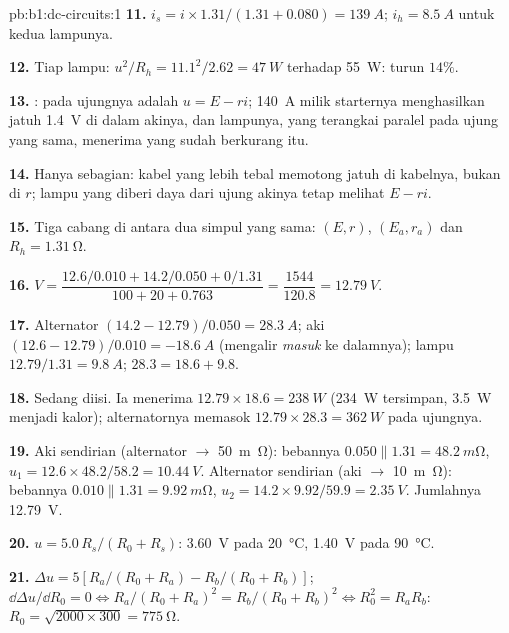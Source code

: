 \begin{solution}{pb:b1:dc-circuits:1}
\textbf{11.} $i_s = i \times 1.31/(1.31 + 0.080) = \qty{139}{A}$; $i_h =
\qty{8.5}{A}$ untuk kedua lampunya.

\textbf{12.} Tiap lampu: $u^2/R_h = 11.1^2/2.62 = \qty{47}{W}$ terhadap
\qty{55}{W}: turun $14\%$.

\textbf{13.} :  pada ujungnya adalah $u = E - ri$;
\qty{140}{A} milik starternya menghasilkan jatuh  \qty{1.4}{V}
di dalam akinya, dan lampunya, yang terangkai paralel pada ujung yang
sama, menerima  yang sudah berkurang itu.

\textbf{14.} Hanya sebagian: kabel yang lebih tebal memotong jatuh
 di kabelnya, bukan di $r$; lampu yang diberi daya dari ujung
akinya tetap melihat $E - ri$.

\textbf{15.} Tiga cabang di antara dua simpul yang sama: $(E, r)$,
$(E_a, r_a)$ dan $R_h = \qty{1.31}{\ohm}$.

\textbf{16.} $V = \dfrac{12.6/0.010 + 14.2/0.050 + 0/1.31}{100 + 20 + 0.763}
= \dfrac{1544}{120.8} = \qty{12.79}{V}$.

\textbf{17.} Alternator $(14.2 - 12.79)/0.050 = \qty{28.3}{A}$; aki
$(12.6 - 12.79)/0.010 = \qty{-18.6}{A}$ (mengalir \emph{masuk} ke
dalamnya); lampu $12.79/1.31 = \qty{9.8}{A}$; $28.3 = 18.6 + 9.8$.

\textbf{18.} Sedang diisi. Ia menerima $12.79 \times 18.6 = \qty{238}{W}$
(\qty{234}{W} tersimpan, \qty{3.5}{W} menjadi kalor); alternatornya
memasok $12.79 \times 28.3 = \qty{362}{W}$ pada ujungnya.

\textbf{19.} Aki sendirian (alternator $\to$ \qty{50}{m\ohm}): bebannya
$0.050 \parallel 1.31 = \qty{48.2}{m\ohm}$, $u_1 = 12.6 \times 48.2/58.2 =
\qty{10.44}{V}$. Alternator sendirian (aki $\to$ \qty{10}{m\ohm}): bebannya
$0.010 \parallel 1.31 = \qty{9.92}{m\ohm}$, $u_2 = 14.2 \times 9.92/59.9 =
\qty{2.35}{V}$. Jumlahnya \qty{12.79}{V}.

\textbf{20.} $u = 5.0\,R_s/(R_0 + R_s)$: \qty{3.60}{V} pada
\qty{20}{\degreeCelsius}, \qty{1.40}{V} pada \qty{90}{\degreeCelsius}.

\textbf{21.} $\Delta u = 5[R_a/(R_0 + R_a) - R_b/(R_0 + R_b)]$;
$\dd\Delta u/\dd R_0 = 0 \Leftrightarrow R_a/(R_0 + R_a)^2 = R_b/(R_0 +
R_b)^2 \Leftrightarrow R_0^2 = R_aR_b$: $R_0 = \sqrt{2000 \times 300} =
\qty{775}{\ohm}$.


\end{solution}
